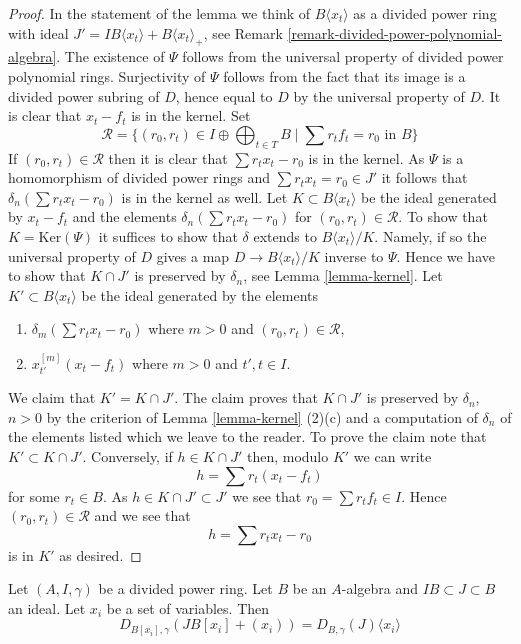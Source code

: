 \begin{proof}
In the statement of the lemma we think of $B\langle x_t \rangle$
as a divided power ring with ideal
$J' = IB\langle x_t \rangle + B\langle x_t \rangle_{+}$, see
Remark \ref{remark-divided-power-polynomial-algebra}.
The existence of $\Psi$ follows from the universal property of
divided power polynomial rings. Surjectivity of $\Psi$ follows from
the fact that its image is a divided power subring of $D$, hence equal to $D$
by the universal property of $D$. It is clear that
$x_t - f_t$ is in the kernel. Set
$$
\mathcal{R} = \{(r_0, r_t) \in I \oplus \bigoplus\nolimits_{t \in T} B
\mid \sum r_t f_t = r_0 \text{ in }B\}
$$
If $(r_0, r_t) \in \mathcal{R}$ then it is clear that
$\sum r_t x_t - r_0$ is in the kernel.
As $\Psi$ is a homomorphism of divided power rings
and $\sum r_tx_t = r_0 \in J'$
it follows that $\delta_n(\sum r_t x_t - r_0)$ is in the kernel as well.
Let $K \subset B\langle x_t \rangle$ be the ideal generated by
$x_t - f_t$ and the elements $\delta_n(\sum r_t x_t - r_0)$ for
$(r_0, r_t) \in \mathcal{R}$.
To show that $K = \text{Ker}(\Psi)$ it suffices to show that
$\delta$ extends to $B\langle x_t \rangle/K$. Namely, if so the universal
property of $D$ gives a map $D \to B\langle x_t \rangle/K$
inverse to $\Psi$. Hence we have to show that $K \cap J'$ is
preserved by $\delta_n$, see Lemma \ref{lemma-kernel}.
Let $K' \subset B\langle x_t \rangle$ be the ideal
generated by the elements
\begin{enumerate}
\item $\delta_m(\sum r_t x_t - r_0)$ where $m > 0$ and
$(r_0, r_t) \in \mathcal{R}$,
\item $x_{t'}^{[m]}(x_t - f_t)$ where $m > 0$ and $t', t \in I$.
\end{enumerate}
We claim that $K' = K \cap J'$. The claim proves that $K \cap J'$
is preserved by $\delta_n$, $n > 0$ by the criterion of
Lemma \ref{lemma-kernel} (2)(c) and a computation of $\delta_n$
of the elements listed which we leave to the reader.
To prove the claim note that $K' \subset K \cap J'$.
Conversely, if $h \in K \cap J'$ then, modulo $K'$ we can write
$$
h = \sum r_t (x_t - f_t)
$$
for some $r_t \in B$. As $h \in K \cap J' \subset J'$
we see that $r_0 = \sum r_t f_t \in I$. Hence $(r_0, r_t) \in \mathcal{R}$
and we see that
$$
h = \sum r_t x_t - r_0
$$
is in $K'$ as desired.
\end{proof}

\begin{lemma}
\label{lemma-divided-power-envelope-add-variables}
Let $(A, I, \gamma)$ be a divided power ring.
Let $B$ be an $A$-algebra and $IB \subset J \subset B$ an ideal.
Let $x_i$ be a set of variables. Then
$$
D_{B[x_i], \gamma}(JB[x_i] + (x_i)) = D_{B, \gamma}(J) \langle x_i \rangle
$$
\end{lemma}

